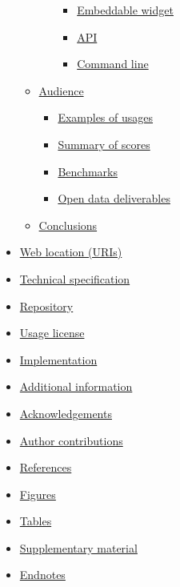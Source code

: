 \documentclass[
]{article}
\providecommand{\tightlist}{%
  \setlength{\itemsep}{0pt}\setlength{\parskip}{0pt}}
\begin{document}
\begin{itemize}
\begin{itemize}
\begin{itemize}
      \begin{itemize}
      \tightlist
      \item
        \protect\hyperlink{embeddable-widget}{Embeddable widget}
      \item
        \protect\hyperlink{api}{API}
      \item
        \protect\hyperlink{command-line}{Command line}
      \end{itemize}
    \end{itemize}
  \item
    \protect\hyperlink{audience}{Audience}

    \begin{itemize}
    \tightlist
    \item
      \protect\hyperlink{examples-of-usages}{Examples of usages}
    \item
      \protect\hyperlink{summary-of-scores}{Summary of scores}
    \item
      \protect\hyperlink{benchmarks}{Benchmarks}
    \item
      \protect\hyperlink{open-data-deliverables}{Open data deliverables}
    \end{itemize}
  \item
    \protect\hyperlink{conclusions}{Conclusions}
  \end{itemize}
\item
  \protect\hyperlink{web-location-uris}{Web location (URIs)}
\item
  \protect\hyperlink{technical-specification}{Technical specification}
\item
  \protect\hyperlink{repository}{Repository}
\item
  \protect\hyperlink{usage-license}{Usage license}
\item
  \protect\hyperlink{implementation}{Implementation}
\item
  \protect\hyperlink{additional-information}{Additional information}
\item
  \protect\hyperlink{acknowledgements}{Acknowledgements}
\item
  \protect\hyperlink{author-contributions}{Author contributions}
\item
  \protect\hyperlink{references}{References}
\item
  \protect\hyperlink{figures}{Figures}
\item
  \protect\hyperlink{tables}{Tables}
\item
  \protect\hyperlink{supplementary-material}{Supplementary material}
\item
  \protect\hyperlink{endnotes}{Endnotes}
\end{itemize}
\end{document}
